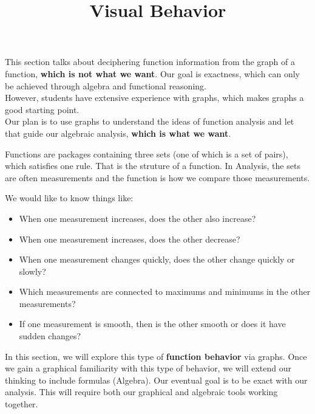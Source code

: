 \documentclass{ximera}
\title{Visual Behavior}
\begin{document}
\begin{abstract}
\end{abstract}
\maketitle






\begin{warning}


This section talks about deciphering function information from the graph of a function, \textbf{\textcolor{red!80!black}{which is not what we want}}.  Our goal is exactness, which can only be achieved through algebra and functional reasoning.\\

However, students have extensive experience with graphs, which makes graphs a good starting point. \\

Our plan is to use graphs to understand the ideas of function analysis and let that guide our algebraic analysis, \textbf{\textcolor{red!80!black}{which is what we want}}.

\end{warning}



Functions are packages containing three sets (one of which is a set of pairs), which satisfies one rule.  That is the struture of a function.  In Analysis, the sets are often measurements and the function is how we compare those measurements.

We would like to know things like:

\begin{itemize}
\item When one measurement increases, does the other also increase?
\item When one measurement increases, does the other decrease?
\item When one measurement changes quickly, does the other change quickly or slowly?
\item Which measurements are connected to maximums and minimums in the other measurements?
\item If one measurement is smooth, then is the other smooth or does it have sudden changes?
\end{itemize}


In this section, we will explore this type of \textbf{function behavior} via graphs. Once we gain a graphical familiarity with this type of behavior, we will extend our thinking to include formulas (Algebra).  Our eventual goal is to be exact with our analysis.  This will require both our graphical and algebraic tools working together.
\end{document}
